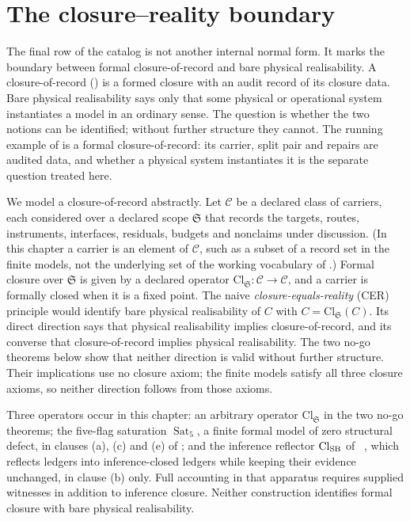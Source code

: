 \section{The closure--reality boundary}\label{sec:anchor:closure-reality-boundary}

The final row of the catalog is not another internal normal form.  It
marks the boundary between formal closure-of-record and bare physical
realisability.  A closure-of-record () is a
formed closure with an audit record of its closure data.  Bare physical
realisability says only that some physical or operational system
instantiates a model in an ordinary sense.  The question is whether the
two notions can be identified; without further structure they cannot.
The running example of  is a formal closure-of-record:
its carrier, split pair and repairs are audited data, and whether a
physical system instantiates it is the separate question treated here.

We model a closure-of-record abstractly.  Let \(\mathcal C\) be a
declared class of carriers, each considered over a declared scope
\(\mathfrak S\) that records the targets, routes, instruments,
interfaces, residuals, budgets and nonclaims under discussion.  (In this
chapter a carrier is an element of \(\mathcal C\), such as a subset of
a record set in the finite models, not the underlying set of the
working vocabulary of .)  Formal closure over
\(\mathfrak S\) is given by a declared operator
\(\mathrm{Cl}_{\mathfrak S}:\mathcal C\to\mathcal C\), and a carrier is
formally closed when it is a fixed point.  The naive
\emph{closure-equals-reality} (CER) principle would identify bare
physical realisability of \(C\) with \(C=\mathrm{Cl}_{\mathfrak S}(C)\).
Its direct direction says that physical realisability implies
closure-of-record, and its converse that closure-of-record implies
physical realisability.  The two no-go theorems below show that neither
direction is valid without further structure.  Their implications use
no closure axiom; the finite models satisfy all three closure axioms,
so neither direction follows from those axioms.

Three operators occur in this chapter: an arbitrary operator
\(\mathrm{Cl}_{\mathfrak S}\) in the two no-go theorems; the five-flag
saturation \(\operatorname{Sat}_5\), a finite formal model of zero
structural defect, in clauses (a), (c) and (e) of ; and
the inference reflector \(\mathrm{Cl}_{\mathrm{SB}}\) of \PaperAOR\
\citep{Tsiokos2026AOR}, which reflects ledgers into inference-closed
ledgers while keeping their evidence unchanged, in clause (b) only.
Full accounting in that apparatus requires supplied witnesses in
addition to inference closure.  Neither construction identifies formal
closure with bare physical realisability.

